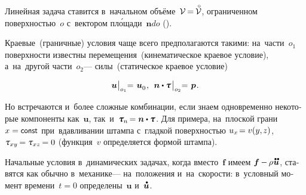 \begin{otherlanguage}{russian}
Линейная задача ставится в~начальном объёме~\hbox{$\mathcal{V} \hspace{-0.2ex} = \hspace{-0.2ex} \mathcircabove{\mathcal{V}}$\hspace{-0.12em}}, ограниченном поверхностью~$o$ с~вектором пл\'{о}щади~${\bm{n} do}$ ().

Краевые~(граничные) условия чаще всего предполагаются такими: на~\hbox{части~${o_1}$} поверхности известны перемещения~(кинематическое краевое условие), а~на~другой \hbox{части~${o_2}$}\:--- силы~(статическое краевое условие) %

\nopagebreak\vspace{-0.64em}\begin{equation}
\bm{u} \hspace{0.1ex} \bigr|_{o_1} \hspace{-0.64ex} = \hspace{0.2ex} \bm{u}_{\raisemath{-0.1em}{0}} \hspace{0.16ex} , \:\:
\bm{n} \dotp \mathboldtau \hspace{.2ex} \bigr|_{o_2} \hspace{-0.64ex} = \hspace{.2ex} \bm{p} \hspace{.16ex} .
\end{equation}

Но встречаются и~более сложные комбинации, если знаем одно\-времен\-но некоторые компоненты как~$\bm{u}$, так~и~${\mathboldtau_{\hspace{-0.1ex}n} \hspace{-0.25ex} = \bm{n} \dotp \mathboldtau}$. Для примера, на~плоской грани~${x = \const}$ при~вдавливании штампа с~гладкой поверхностью ${u_x \hspace{-0.32ex} = v (y , \hspace{-0.1ex} z)}$, ${\mathtau_{xy} \hspace{-0.2ex} = \mathtau_{xz} \hspace{-0.2ex} = 0}$ (функция~$v$ определяется формой штампа).

Начальные условия в~динамических задачах, когда вместо~$\bm{f}$ имеем ${\bm{f} \hspace{-0.1ex} - \hspace{-0.1ex} \rho \hspace{0.1ex} \mathdotdotabove{\bm{u}}}$, ставятся как обычно в~механике\:--- на~положения и~на~скорости: в~условный момент времени~${t \!=\! 0}$ определены~$\bm{u}$ и~$\mathdotabove{\bm{u}}$.


\end{otherlanguage}
